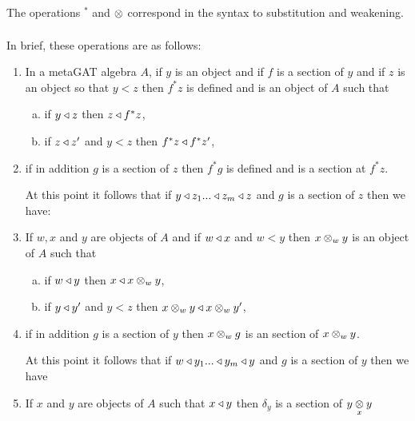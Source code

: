 \documentclass[10pt,a4paper]{article}
\begin{document}
\vspace{1cm}
The  operations $^*$ and $\crossx{}{}{}$  
 correspond in the syntax to  substitution and  weakening. 

In brief, these operations are as follows:

\begin{enumerate}
\item In a metaGAT algebra $A$, if $y$ is an object and if $f$ is a section of $y$ and if $z$ is an object so that $y < z$ then $f^*z$ is defined and is an object of $A$ 
      such that 
			\begin{enumerate}[(a)]
			\item if $y \base z$ then $z \base f^*z$,
			\item if $z \base z'$ and $y <z$ then $f^*z \base f^*z'$,
			\end{enumerate}
\item if in addition $g$ is a section of $z$ then $f^*g$ is defined and is a section at $f^*z$. 

At this point it follows that if $y \base z_1 ... \base z_m \base z$ and $g$ is a section of $z$ then we have:

 

\item If $w,x$ and $y$ are objects of $A$  and if $w \base x$ and $w < y$ then $x \cross_w y$ is an object of $A$ 
such that
    \begin{enumerate}[(a)]
		\item if $w \base y$ then $x \base x \cross_w y$,
		\item if $y \base y'$ and $y <z$ then $x \cross_w y \base x \cross_w y'$,
		\end{enumerate}
\item if in addition $g$ is a section of $y$ then $x \cross_w g$ is an section of $x \cross_w y$.

At this point it follows that if $w \base y_1 ... \base y_m \base y$ and $g$ is a section of $y$ then we have

\vspace{0.5cm}
\item If $x$ and $y$ are objects of $A$ such that $x \base y$ then $\delta_y$ is a section of $\crossx{y}{y}{x}$
\vspace{0.5cm}
 
\end{enumerate}
\end{document}
